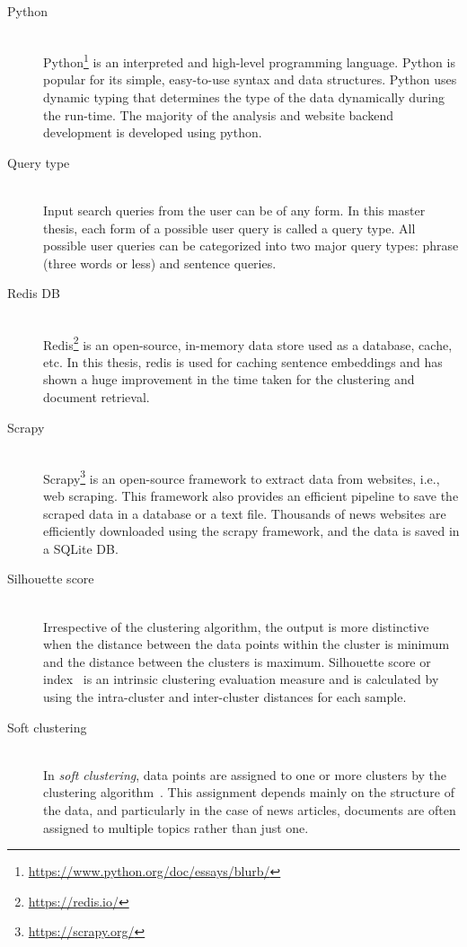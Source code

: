 \begin{description}
		
	\item[Python] \hfill \\ Python\footnote{\url{https://www.python.org/doc/essays/blurb/}} is an interpreted and high-level programming language.
	Python is popular for its simple, easy-to-use syntax and data structures. Python uses
	dynamic typing that determines the type of the data dynamically during the run-time.
	The majority of the analysis and website backend development is developed using python.
	
		\item[Query type] \hfill \\ Input search queries from the user can be of any form. In this master thesis, each form of a possible user query is called a query type. All possible user queries can be categorized into two major query types: phrase (three words or less) and sentence queries.
		
			\item[Redis DB] \hfill \\  Redis\footnote{\url{https://redis.io/}} is an open-source, in-memory data store used as a database, cache, etc. In this thesis, redis is used for caching sentence embeddings and has shown a huge improvement in the time taken for the clustering and document retrieval.
			
				\item[Scrapy] \hfill \\ Scrapy\footnote{\url{https://scrapy.org/}} is an open-source framework to extract data from websites, i.e., web scraping. This framework also provides an efficient pipeline to save the scraped data in a database or a text file. Thousands of news websites are efficiently downloaded using the scrapy framework, and the data is saved in a SQLite DB.
			
			\item[Silhouette score] \hfill \\ 
		Irrespective of the clustering algorithm, the output is more distinctive when the distance between the data points within the cluster is minimum and the distance between the clusters is maximum. Silhouette score or index~\cite{rousseeuw1987silhouettes} is an intrinsic clustering evaluation measure and is calculated by using the intra-cluster and inter-cluster distances for each sample.
		
			\item[Soft clustering] \hfill \\ In \emph{soft clustering}, data points are assigned to one or more clusters by the clustering algorithm~\cite{de2012document}. This assignment depends mainly on the structure of the data, and particularly in the case of news articles, documents are often assigned to multiple topics rather than just one.
		

\end{description}
